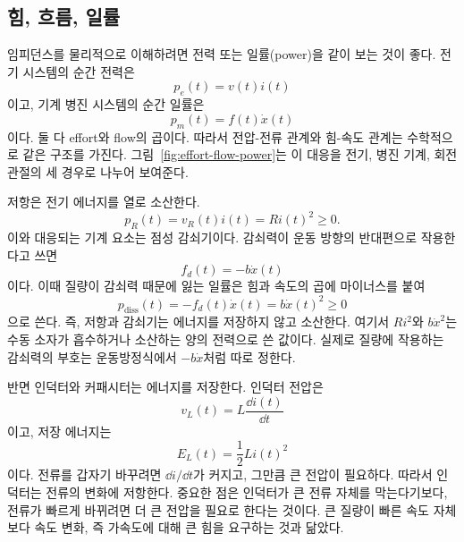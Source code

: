 \subsection{힘, 흐름, 일률}

임피던스를 물리적으로 이해하려면 전력 또는 일률(power)을 같이 보는 것이 좋다.
전기 시스템의 순간 전력은
\begin{equation}
  p_e(t) = v(t)i(t)
\end{equation}
이고, 기계 병진 시스템의 순간 일률은
\begin{equation}
  p_m(t) = f(t)\dot{x}(t)
\end{equation}
이다.
둘 다 effort와 flow의 곱이다.
따라서 전압-전류 관계와 힘-속도 관계는 수학적으로 같은 구조를 가진다.
그림~\ref{fig:effort-flow-power}는 이 대응을 전기, 병진 기계, 회전 관절의 세 경우로 나누어 보여준다.



저항은 전기 에너지를 열로 소산한다.
\begin{equation}
  p_R(t) = v_R(t)i(t) = R i(t)^2 \ge 0.
\end{equation}
이와 대응되는 기계 요소는 점성 감쇠기이다.
감쇠력이 운동 방향의 반대편으로 작용한다고 쓰면
\begin{equation}
  f_d(t) = -b\dot{x}(t)
\end{equation}
이다.
이때 질량이 감쇠력 때문에 잃는 일률은 힘과 속도의 곱에 마이너스를 붙여
\begin{equation}
  p_{\mathrm{diss}}(t) = -f_d(t)\dot{x}(t)=b\dot{x}(t)^2 \ge 0
\end{equation}
으로 쓴다.
즉, 저항과 감쇠기는 에너지를 저장하지 않고 소산한다.
여기서 $R i^2$와 $b\dot{x}^2$는 수동 소자가 흡수하거나 소산하는 양의 전력으로 쓴 값이다.
실제로 질량에 작용하는 감쇠력의 부호는 운동방정식에서 $-b\dot{x}$처럼 따로 정한다.

반면 인덕터와 커패시터는 에너지를 저장한다.
인덕터 전압은
\begin{equation}
  v_L(t) = L\frac{\dd i(t)}{\dd t}
\end{equation}
이고, 저장 에너지는
\begin{equation}
  E_L(t) = \frac{1}{2}L i(t)^2
\end{equation}
이다.
전류를 갑자기 바꾸려면 $\dd i/\dd t$가 커지고, 그만큼 큰 전압이 필요하다.
따라서 인덕터는 전류의 변화에 저항한다.
중요한 점은 인덕터가 큰 전류 자체를 막는다기보다, 전류가 빠르게 바뀌려면 더 큰 전압을 필요로 한다는 것이다.
큰 질량이 빠른 속도 자체보다 속도 변화, 즉 가속도에 대해 큰 힘을 요구하는 것과 닮았다.

